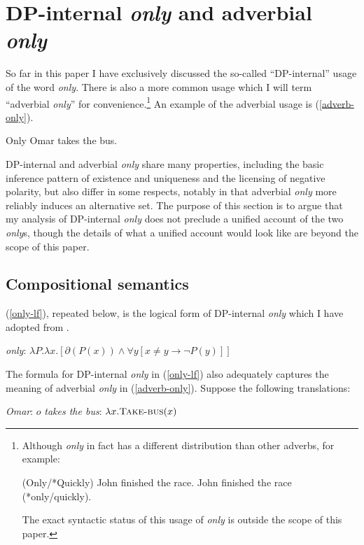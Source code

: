 \section{DP-internal \textit{only} and adverbial \textit{only} \label{sec:two-onlys}}
So far in this paper I have exclusively discussed the so-called ``DP-internal'' usage of the word \textit{only}. There is also a more common usage which I will term ``adverbial \textit{only}'' for convenience.\footnote{Although \textit{only} in fact has a different distribution than other adverbs, for example: \begin{exe} \ex (Only/*Quickly) John finished the race. \ex John finished the race (*only/quickly). \end{exe} The exact syntactic status of this usage of \textit{only} is outside the scope of this paper.} An example of the adverbial usage is (\ref{adverb-only}).

\begin{exe}
	\ex \label{adverb-only} Only Omar takes the bus.
\end{exe}

DP-internal and adverbial \textit{only} share many properties, including the basic inference pattern of existence and uniqueness and the licensing of negative polarity, but also differ in some respects, notably in that adverbial \textit{only} more reliably induces an alternative set. The purpose of this section is to argue that my analysis of DP-internal \textit{only} does not preclude a unified account of the two \textit{only}s, though the details of what a unified account would look like are beyond the scope of this paper.

\subsection{Compositional semantics}
(\ref{only-lf}), repeated below, is the logical form of DP-internal \textit{only} which I have adopted from \citet{cb2015}.

\begin{exe}
	 \textit{only}: $ \lambda P . \lambda x . [ \partial(P(x)) \land \forall y [ x \ne y \to \neg P(y) ] ] $
\end{exe}

The formula for DP-internal \textit{only} in (\ref{only-lf}) also adequately captures the meaning of adverbial \textit{only} in (\ref{adverb-only}). Suppose the following translations:

\begin{exe}
	\ex \textit{Omar}: $o$
	\ex \textit{takes the bus}: $\lambda x . \textsc{Take-bus}(x)$
\end{exe}


